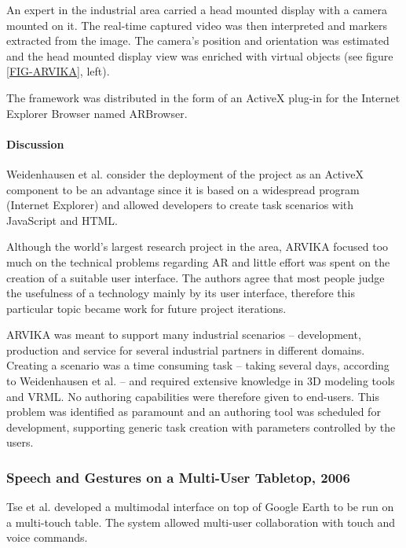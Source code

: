 An expert in the industrial area carried a head mounted display with a camera mounted on it.
The real-time captured video was then interpreted and markers extracted from the image.
The camera's position and orientation was estimated and the head mounted display view was
enriched with virtual objects (see figure \ref{FIG-ARVIKA}, left).

The framework was distributed in the form of an ActiveX plug-in for the Internet Explorer Browser
named ARBrowser.

\paragraph{Discussion}
\label{sec:Discussion}

Weidenhausen et al. \cite{ARVIKA-LESSONS} consider the deployment of the project as an ActiveX component
to be an advantage since it is based on a widespread program (Internet Explorer) and allowed developers
to create task scenarios with JavaScript and HTML.

Although the world's largest research project in the area, ARVIKA focused too
much on the technical problems regarding AR and little effort was spent on the creation of a
suitable user interface. The authors agree that most people judge the usefulness of a technology
mainly by its user interface, therefore this particular topic became work for future project iterations.

ARVIKA was meant to support many industrial scenarios -- development, production and service for several
industrial partners in different domains. Creating a scenario was a time consuming task -- taking several days,
according to Weidenhausen et al. -- and required extensive knowledge in 3D modeling tools and VRML.
No authoring capabilities were therefore given to end-users.
This problem was identified as paramount and an authoring tool was scheduled for development,
supporting generic task creation with parameters controlled by the users.



\subsubsection{Speech and Gestures on a Multi-User Tabletop, 2006}

Tse et al. \cite{SP-GEST-TTOP} developed a multimodal interface on top of Google Earth to be run
on a multi-touch table. The system allowed multi-user collaboration with touch and voice commands.

